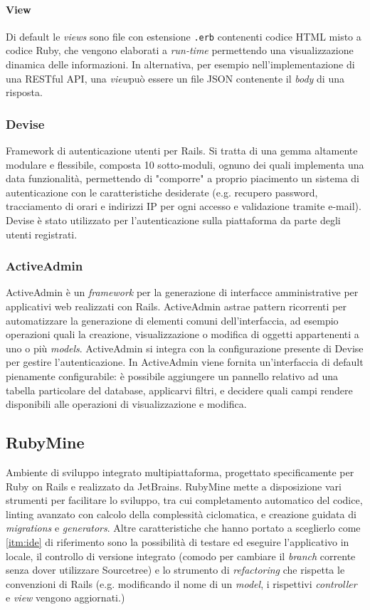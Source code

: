 \paragraph{View}
Di default le \textit{views} sono file con estensione \texttt{.erb} contenenti codice HTML misto a codice Ruby, che vengono elaborati a \textit{run-time} permettendo una visualizzazione dinamica delle informazioni. In alternativa, per esempio nell'implementazione di una RESTful API, una \textit{view}può essere un file JSON contenente il \textit{body} di una risposta.

\subsubsection{Devise}
Framework di autenticazione utenti per Rails. Si tratta di una gemma altamente modulare e flessibile, composta 10 sotto-moduli, ognuno dei quali implementa una data funzionalità, permettendo di "comporre" a proprio piacimento un sistema di autenticazione con le caratteristiche desiderate (e.g. recupero password, tracciamento di orari e indirizzi IP per ogni accesso e validazione tramite e-mail). Devise è stato utilizzato per l'autenticazione sulla piattaforma da parte degli utenti registrati.

\subsubsection{ActiveAdmin}
ActiveAdmin è un \textit{framework} per la generazione di interfacce amministrative per applicativi web realizzati con Rails. ActiveAdmin astrae pattern ricorrenti per automatizzare la generazione di elementi comuni dell'interfaccia, ad esempio operazioni quali la creazione, visualizzazione o modifica di oggetti appartenenti a uno o più \textit{models}. ActiveAdmin si integra con la configurazione presente di Devise per gestire l'autenticazione. In ActiveAdmin viene fornita un'interfaccia di default pienamente configurabile: è possibile aggiungere un pannello relativo ad una tabella particolare del database, applicarvi filtri, e decidere quali campi rendere disponibili alle operazioni di visualizzazione e modifica.

\subsection{RubyMine}
Ambiente di sviluppo integrato multipiattaforma, progettato specificamente per Ruby on Rails e realizzato da JetBrains. RubyMine mette a disposizione vari strumenti per facilitare lo sviluppo, tra cui completamento automatico del codice, linting avanzato con calcolo della complessità ciclomatica, e creazione guidata di \textit{migrations} e \textit{generators}. Altre caratteristiche che hanno portato a sceglierlo come \ref{itm:ide} di riferimento sono la possibilità di testare ed eseguire l'applicativo in locale, il controllo di versione integrato (comodo per cambiare il \textit{branch} corrente senza dover utilizzare Sourcetree) e lo strumento di \textit{refactoring} che rispetta le convenzioni di Rails (e.g. modificando il nome di un \textit{model}, i rispettivi \textit{controller} e \textit{view} vengono aggiornati.) 


